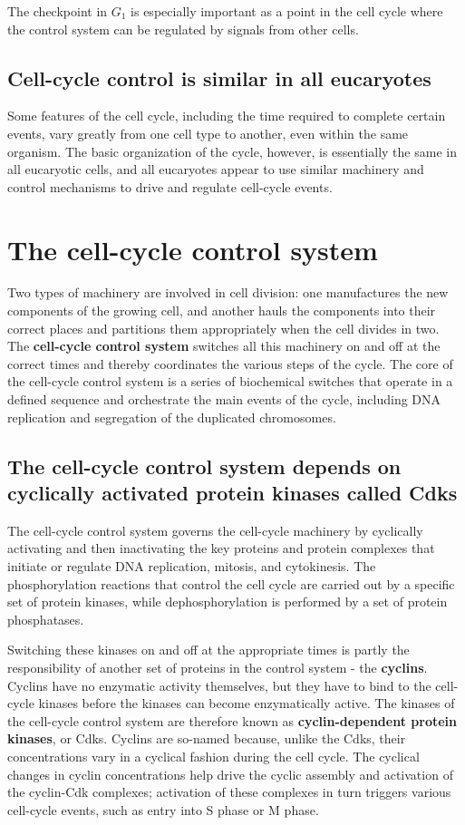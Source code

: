 The checkpoint in $G_1$ is especially important as a point in the cell cycle
where the control system can be regulated by signals from other cells.

\subsection{Cell-cycle control is similar in all eucaryotes}

Some features of the cell cycle, including the time required to complete
certain events, vary greatly from one cell type to another, even within the
same organism. The basic organization of the cycle, however, is essentially
the same in all eucaryotic cells, and all eucaryotes appear to use
similar machinery and control mechanisms to drive and regulate cell-cycle events.

\section{The cell-cycle control system}

Two types of machinery are involved in cell division: one manufactures
the new components of the growing cell, and another hauls the components
into their correct places and partitions them appropriately when
the cell divides in two. The \textbf{cell-cycle control system} switches all this
machinery on and off at the correct times and thereby coordinates the
various steps of the cycle. The core of the cell-cycle control system is a
series of biochemical switches that operate in a defined sequence and
orchestrate the main events of the cycle, including DNA replication and
segregation of the duplicated chromosomes.

\subsection{The cell-cycle control system depends on cyclically activated protein kinases called Cdks}

The cell-cycle control system governs the cell-cycle machinery by cyclically
activating and then inactivating the key proteins and protein complexes
that initiate or regulate DNA replication, mitosis, and cytokinesis.
The phosphorylation reactions that control
the cell cycle are carried out by a specific set of protein kinases, while
dephosphorylation is performed by a set of protein phosphatases.

Switching these kinases on and off at the appropriate times is partly
the responsibility of another set of proteins in the control system - the
\textbf{cyclins}. Cyclins have no enzymatic activity themselves, but they have to
bind to the cell-cycle kinases before the kinases can become enzymatically
active. The kinases of the cell-cycle control system are therefore
known as \textbf{cyclin-dependent protein kinases}, or Cdks.
Cyclins are so-named because, unlike the Cdks, their concentrations
vary in a cyclical fashion during the cell cycle. The cyclical changes in
cyclin concentrations help drive the cyclic assembly and activation of
the cyclin-Cdk complexes; activation of these complexes in turn triggers
various cell-cycle events, such as entry into S phase or M phase.

